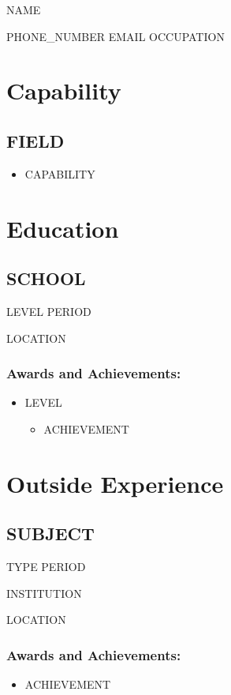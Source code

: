 \documentclass{resume}
\begin{document}
\centerline{\Huge\scshape{NAME}}
\vspace{1.25ex}

\centerline{\sffamily\large{
	PHONE_NUMBER\textperiodcentered
	EMAIL\textperiodcentered
	OCCUPATION
}}
\vspace{1.5ex}

\section{Capability}
	\subsection{FIELD}
		\begin{itemize}
			\item CAPABILITY
		\end{itemize}

\section{Education}
	\subsection{SCHOOL}
		LEVEL \hfill PERIOD

        LOCATION

		\subsubsection{Awards and Achievements:}
			\begin{itemize}
				\item LEVEL
					\begin{itemize}
					\item ACHIEVEMENT
					\end{itemize}
			\end{itemize}

\section{Outside Experience}
	\subsection{SUBJECT}
        TYPE \hfill PERIOD

        INSTITUTION

        LOCATION

		\subsubsection{Awards and Achievements:}
		\begin{itemize}
			\item ACHIEVEMENT
		\end{itemize}
\end{document}
